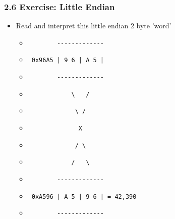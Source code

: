 \begin{frame}[fragile]
  \frametitle{2.6 Exercise: Little Endian}
    \begin{itemize}
        \item[] Read and interpret this little endian 2 byte 'word'
            \begin{itemize}
                \item[] \begin{verbatim}        ------------- \end{verbatim}
                \item[] \begin{verbatim} 0x96A5 | 9 6 | A 5 | \end{verbatim}
                \item[] \begin{verbatim}        ------------- \end{verbatim}
                \item[] \begin{verbatim}            \   /   \end{verbatim}
                \item[] \begin{verbatim}             \ /      \end{verbatim}
                \item[] \begin{verbatim}              X       \end{verbatim}
                \item[] \begin{verbatim}             / \      \end{verbatim}
                \item[] \begin{verbatim}            /   \   \end{verbatim}
                \item[] \begin{verbatim}        ------------- \end{verbatim}
                \item[] \begin{verbatim} 0xA596 | A 5 | 9 6 | = 42,390 \end{verbatim}
                \item[] \begin{verbatim}        ------------- \end{verbatim}
            \end{itemize}
    \end{itemize}
\end{frame}


